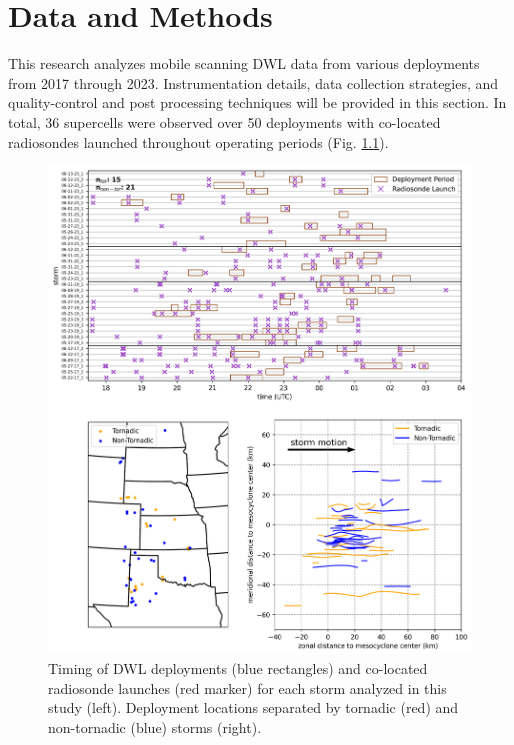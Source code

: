 \chapter{Data and Methods}
\label{chap:data_methods}

This research analyzes mobile scanning DWL data from various deployments from 2017 through 2023. Instrumentation details, data collection strategies, and quality-control and post processing techniques will be provided in this section. In total, 36 supercells were observed over 50 deployments with co-located radiosondes launched throughout operating periods (Fig. \ref{fig:dep_details}). 

\begin{figure}[h!]
    \centering
    \includegraphics[width = 1\textwidth]{figures/dep_details.png}
    \caption{Timing of DWL deployments (blue rectangles) and co-located radiosonde launches (red marker) for each storm analyzed in this study (left). Deployment locations separated by tornadic (red) and non-tornadic (blue) storms (right).}
    \label{fig:dep_details}
\end{figure}

